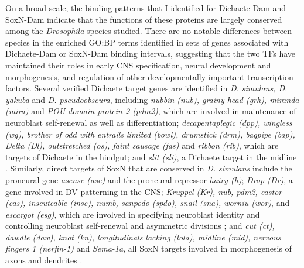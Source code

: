 On a broad scale, the binding patterns that I identified for Dichaete-Dam and SoxN-Dam indicate that the functions of these proteins are largely conserved among the \emph{Drosophila} species studied. There are no notable differences between species in the enriched GO:BP terms identified in sets of genes associated with Dichaete-Dam or SoxN-Dam binding intervals, suggesting that the two TFs have maintained their roles in early CNS specification, neural development and morphogenesis, and regulation of other developmentally important transcription factors. Several verified Dichaete target genes are identified in \emph{D. simulans, D. yakuba} and \emph{D. pseudoobscura}, including \emph{nubbin (nub), grainy head (grh), miranda (mira)} and \emph{POU domain protein 2 (pdm2)}, which are involved in maintenance of neuroblast self-renewal as well as differentiation; \emph{decapentaplegic (dpp), wingless (wg), brother of odd with entrails limited (bowl), drumstick (drm), bagpipe (bap), Delta (Dl), outstretched (os), faint sausage (fas)} and \emph{ribbon (rib)}, which are targets of Dichaete in the hindgut; and \emph{slit (sli)}, a Dichaete target in the midline \citep{aleksic_role_2013}. Similarly, direct targets of SoxN that are conserved in \emph{D. simulans} include the proneural gene \emph{asense (ase)} and the proneural repressor \emph{hairy (h)}; \emph{Drop (Dr)}, a gene involved in DV patterning in the CNS; \emph{Kruppel (Kr), nub, pdm2, castor (cas), inscuteable (insc), numb, sanpodo (spdo), snail (sna), worniu (wor)}, and \emph{escargot (esg)}, which are involved in specifying neuroblast identity and controlling neuroblast self-renewal and asymmetric divisions \citep{buescher_binary_1998,cai_family_2001,isshiki_drosophila_2001,kraut_role_1996,maurange_brainy_2005,oconnor-giles_numb_????,skeath_sanpodo_1998,van_doren_negative_1994}; and \emph{cut (ct), dawdle (daw), knot (kn), longitudinals lacking (lola), midline (mid), nervous fingers 1 (nerfin-1)} and \emph{Sema-1a}, all SoxN targets involved in morphogenesis of axons and dendrites \citep{ferrero_soxneuro_2014,giniger_lola_1994,jinushi-nakao_knot/collier_????,kuzin_nerfin-1_2005,liu_midline_2009,parker_divergent_2006,yu_transmembrane_????}.

